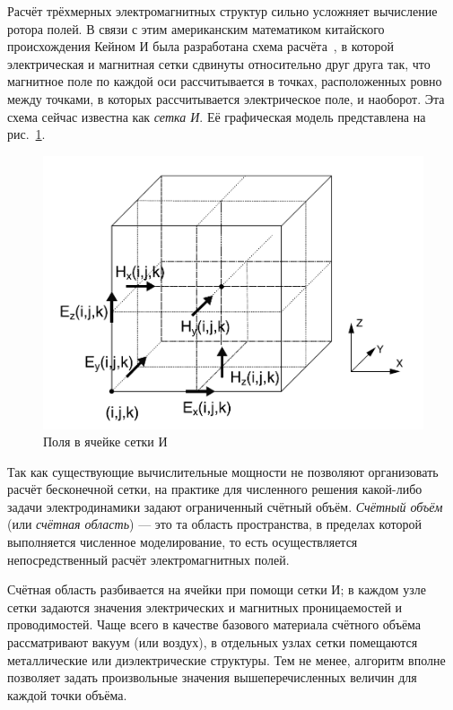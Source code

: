 Расчёт трёхмерных электромагнитных структур сильно усложняет вычисление ротора полей. В связи с этим американским математиком китайского происхождения Кейном И была разработана схема расчёта~\cite{Yee}, в которой электрическая и магнитная сетки сдвинуты относительно друг друга так, что магнитное поле по каждой оси рассчитывается в точках, расположенных ровно между точками, в которых рассчитывается электрическое поле, и наоборот. Эта схема сейчас известна как \textit{сетка И}. Её графическая модель представлена на рис.~\ref{fig:YeeGrid}.

\begin{figure}[p]
\centering
\includegraphics[width=1\textwidth]{include/graphics/image1}
\caption{Поля в ячейке сетки И}
\label{fig:YeeGrid}
\end{figure}

Так как существующие вычислительные мощности не позволяют организовать расчёт бесконечной сетки, на практике для численного решения какой-либо задачи электродинамики задают ограниченный счётный объём. \textit{Счётный объём} (или \textit{счётная область}) --- это та область пространства, в пределах которой выполняется численное моделирование, то есть осуществляется непосредственный расчёт электромагнитных полей.

Счётная область разбивается на ячейки при помощи сетки И; в каждом узле сетки задаются значения электрических и магнитных проницаемостей и проводимостей. Чаще всего в качестве базового материала счётного объёма рассматривают вакуум (или воздух), в отдельных узлах сетки помещаются металлические или диэлектрические структуры. Тем не менее, алгоритм вполне позволяет задать произвольные значения вышеперечисленных величин для каждой точки объёма.

